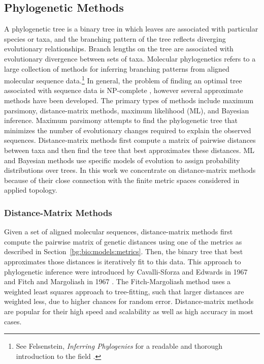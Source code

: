 \subsection{Phylogenetic Methods}
\label{bg:bio:phylo}

A phylogenetic tree is a binary tree in which leaves are associated with particular species or taxa, and the branching pattern of the tree reflects diverging evolutionary relationships.
Branch lengths on the tree are associated with evolutionary divergence between sets of taxa.
Molecular phylogenetics refers to a large collection of methods for inferring branching patterns from aligned molecular sequence data.\footnote{See Felsenstein, \emph{Inferring Phylogenies} for a readable and thorough introduction to the field \cite{Felsenstein:2004ws}.}
In general, the problem of finding an optimal tree associated with sequence data is NP-complete \cite{Foulds:1982fn}, however several approximate methods have been developed.
The primary types of methods include maximum parsimony, distance-matrix methods, maximum likelihood (ML), and Bayesian inference.
Maximum parsimony attempts to find the phylogenetic tree that minimizes the number of evolutionary changes required to explain the observed sequences.
Distance-matrix methods first compute a matrix of pairwise distances between taxa and then find the tree that best approximates these distances.
ML and Bayesian methods use specific models of evolution to assign probability distributions over trees.
In this work we concentrate on distance-matrix methods because of their close connection with the finite metric spaces considered in applied topology.

\subsubsection{Distance-Matrix Methods}
\label{bg:bio:phylo:distance}

Given a set of aligned molecular sequences, distance-matrix methods first compute the pairwise matrix of genetic distances using one of the metrics as described in Section~\ref{bg:bio:models:metrics}.
Then, the binary tree that best approximates those distances is iteratively fit to this data.
This approach to phylogenetic inference were introduced by Cavalli-Sforza and Edwards in 1967 \cite{CavalliSforza:1967th} and Fitch and Margoliash in 1967 \cite{Fitch:1967we}.
The Fitch-Margoliash method uses a weighted least squares approach to tree-fitting, such that larger distances are weighted less, due to higher chances for random error.
Distance-matrix methods are popular for their high speed and scalability as well as high accuracy in most cases.

